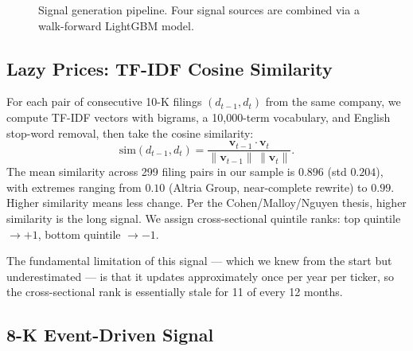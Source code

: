 \documentclass[11pt,a4paper]{article}
\begin{document}
\begin{figure}[H]
\centering
{}
\caption{Signal generation pipeline. Four signal sources are combined via a walk-forward LightGBM model.}
\label{fig:pipeline}
\end{figure}

\subsection{Lazy Prices: TF-IDF Cosine Similarity}
\label{sec:lazy}

For each pair of consecutive 10-K filings $(d_{t-1}, d_t)$ from the same company, we compute TF-IDF vectors with bigrams, a 10{,}000-term vocabulary, and English stop-word removal, then take the cosine similarity:
\begin{equation}
    \text{sim}(d_{t-1}, d_t) = \frac{\mathbf{v}_{t-1} \cdot \mathbf{v}_t}{\|\mathbf{v}_{t-1}\| \, \|\mathbf{v}_t\|}.
\end{equation}
The mean similarity across 299 filing pairs in our sample is $0.896$ (std $0.204$), with extremes ranging from $0.10$ (Altria Group, near-complete rewrite) to $0.99$. Higher similarity means less change. Per the Cohen/Malloy/Nguyen thesis, higher similarity is the long signal. We assign cross-sectional quintile ranks: top quintile $\rightarrow +1$, bottom quintile $\rightarrow -1$.

The fundamental limitation of this signal --- which we knew from the start but underestimated --- is that it updates approximately once per year per ticker, so the cross-sectional rank is essentially stale for 11 of every 12 months.

\subsection{8-K Event-Driven Signal}
\label{sec:events}
\end{document}
